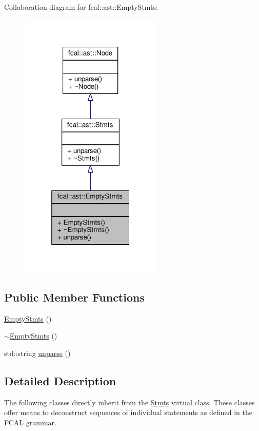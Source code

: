 Collaboration diagram for fcal\+:\+:ast\+:\+:Empty\+Stmts\+:
\nopagebreak
\begin{figure}[H]
\begin{center}
\leavevmode
\includegraphics[width=193pt]{classfcal_1_1ast_1_1EmptyStmts__coll__graph}
\end{center}
\end{figure}
\subsection*{Public Member Functions}
\begin{DoxyCompactItemize}
\item 
\hyperlink{classfcal_1_1ast_1_1EmptyStmts_a3fffb31d194ba39a3f7cb22a75dba005}{Empty\+Stmts} ()
\item 
\hyperlink{classfcal_1_1ast_1_1EmptyStmts_ae477efcd74ff22bbacd04182658ce411}{$\sim$\+Empty\+Stmts} ()
\item 
std\+::string \hyperlink{classfcal_1_1ast_1_1EmptyStmts_abbccd9fb3e02082962774479fc47116d}{unparse} ()
\end{DoxyCompactItemize}


\subsection{Detailed Description}
The following classes directly inherit from the \hyperlink{classfcal_1_1ast_1_1Stmts}{Stmts} virtual class. These classes offer means to deconstruct sequences of individual statements as defined in the F\+C\+AL grammar. 


